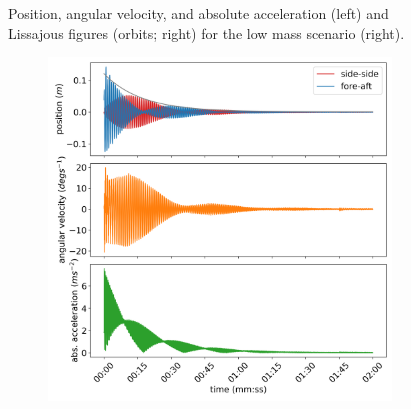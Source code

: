 \documentclass{article}
\begin{document}
\begin{figure}[ht!]
    \caption{Position, angular velocity, and absolute acceleration (left) and Lissajous figures (orbits; right) for the low mass scenario (right).}
    \label{fig:low-mass}
\end{figure}


\begin{figure}

    \centering
    \begin{subfigure}[b]{0.45\textwidth}
        \centering
        \includegraphics[width=\textwidth]{../results/experiment/medium_mass_acceleration.png}
    \end{subfigure}
    \begin{subfigure}[b]{0.45\textwidth}
        \centering

\end{subfigure}
\end{figure}
\end{document}

